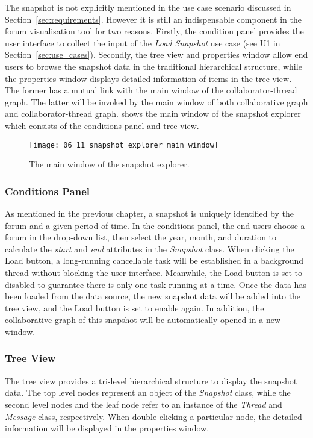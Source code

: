 The snapshot is not explicitly mentioned in the use case scenario discussed in Section~\ref{sec:requirements}. However it is still an indispensable component in the forum visualisation tool for two reasons. Firstly, the condition panel provides the user interface to collect the input of the \emph{Load Snapshot} use case (see U1 in Section~\ref{sec:use_cases}). Secondly, the tree view and properties window allow end users to browse the snapshot data in the traditional hierarchical structure, while the properties window displays detailed information of items in the tree view. The former has a mutual link with the main window of the collaborator-thread graph. The latter will be invoked by the main window of both collaborative graph and collaborator-thread graph.  shows the main window of the snapshot explorer which consists of the conditions panel and tree view.

\begin{figure}[!htb]
  \centering
  \texttt{[image: 06\_11\_snapshot\_explorer\_main\_window]}
  \caption{The main window of the snapshot explorer.}
  \label{Figure:06_11}
\end{figure}

\subsubsection{Conditions Panel}

As mentioned in the previous chapter, a snapshot is uniquely identified by the forum and a given period of time. In the conditions panel, the end users choose a forum in the drop-down list, then select the year, month, and duration to calculate the \emph{start} and \emph{end} attributes in the \emph{Snapshot} class. When clicking the Load button, a long-running cancellable task will be established in a background thread without blocking the user interface. Meanwhile, the Load button is set to disabled to guarantee there is only one task running at a time. Once the data has been loaded from the data source, the new snapshot data will be added into the tree view, and the Load button is set to enable again. In addition, the collaborative graph of this snapshot will be automatically opened in a new window.

\subsubsection{Tree View}
The tree view provides a tri-level hierarchical structure to display the snapshot data. The top level nodes represent an object of the \emph{Snapshot} class, while the second level nodes and the leaf node refer to an instance of the \emph{Thread} and \emph{Message} class, respectively. When double-clicking a particular node, the detailed information will be displayed in the properties window.

